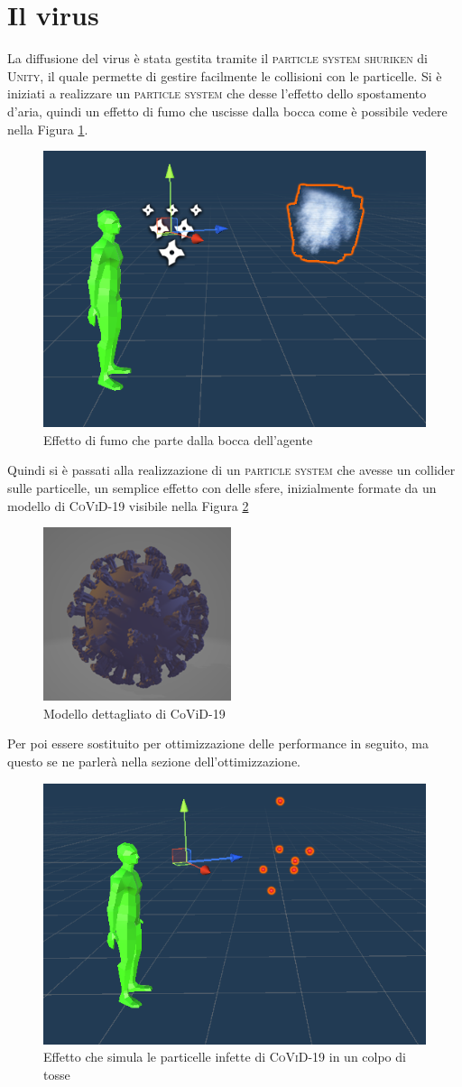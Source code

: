 \documentclass[12pt, openany]{book}
\begin{document}
 	\section{Il virus}
La diffusione del virus è stata gestita tramite il \textsc{particle system shuriken} di \textsc{Unity}, il quale permette di gestire facilmente le collisioni con le particelle. Si è iniziati a realizzare un \textsc{particle system} che desse l'effetto dello spostamento d'aria, quindi un effetto di fumo che uscisse dalla bocca come è possibile vedere nella Figura \ref{fig:SmokeEffect}.
\begin{figure}[H]
	\centering
	\includegraphics[width=0.5\linewidth]{"Immagini/SmokeEffect.png"}
	\caption{Effetto di fumo che parte dalla bocca dell'agente}
	\label{fig:SmokeEffect}
\end{figure}
Quindi si è passati alla realizzazione di un \textsc{particle system} che avesse un collider sulle particelle, un semplice effetto con delle sfere, inizialmente formate da un modello di \textsc{CoViD-19} visibile nella Figura \ref{fig:Covid}
\begin{figure}[H]
	\centering
	\includegraphics[width=0.5\linewidth]{"Immagini/Covid.png"}
	\caption{Modello dettagliato di CoViD-19}
	\label{fig:Covid}
\end{figure}
Per poi essere sostituito per ottimizzazione delle performance in seguito, ma questo se ne parlerà nella sezione dell'ottimizzazione.
\begin{figure}[H]
	\centering
	\includegraphics[width=0.5\linewidth]{"Immagini/CovidEffect.png"}
	\caption{Effetto che simula le particelle infette di \textsc{CoViD-19} in un colpo di tosse}
	\label{fig:CovidEffect}
\end{figure}
\end{document}
